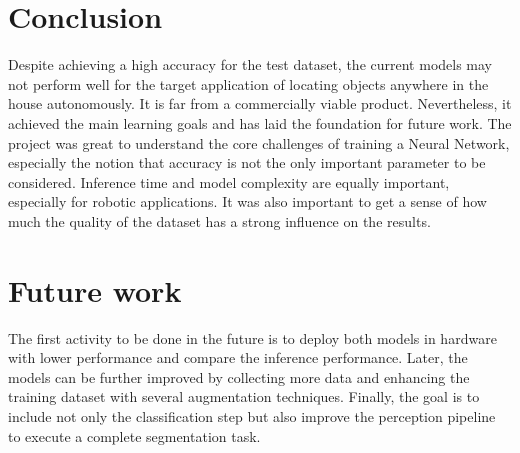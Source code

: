 \documentclass[10pt,journal,compsoc]{IEEEtran}
\begin{document}
\section{Conclusion}

Despite achieving a high accuracy for the test dataset, the current models may not perform well for the target application of locating objects anywhere in the house autonomously. It is far from a commercially viable product. Nevertheless, it achieved the main learning goals and has laid the foundation for future work. The project was great to understand the core challenges of training a Neural Network, especially the notion that accuracy is not the only important parameter to be considered. Inference time and model complexity are equally important, especially for robotic applications. It was also important to get a sense of how much the quality of the dataset has a strong influence on the results.


\section{Future work}

The first activity to be done in the future is to deploy both models in hardware with lower performance and compare the inference performance. Later, the models can be further improved by collecting more data and enhancing the training dataset with several augmentation techniques. 
Finally, the goal is to include not only the classification step but also improve the perception pipeline to execute a complete segmentation task.




\end{document}

